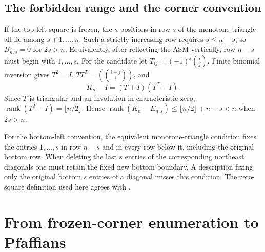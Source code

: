 \documentclass[11pt,a4paper]{amsart}
\theoremstyle{remark}\newtheorem{remark}[theorem]{Remark}
\numberwithin{equation}{section}
\DeclareMathOperator{\rank}{rank}
\begin{document}
\subsection{The forbidden range and the corner convention}
If the top-left square is frozen, the $s$ positions in row $s$ of the monotone triangle all lie among $s+1,\ldots,n$. Such a strictly increasing row requires $s\le n-s$, so $B_{n,s}=0$ for $2s>n$. Equivalently, after reflecting the ASM vertically, row $n-s$ must begin with $1,\ldots,s$.
For the candidate let $T_{ij}=(-1)^j\binom ij$. Finite binomial inversion gives $T^2=I$, $TT^T=(\binom{i+j}{i})$, and
\[
 K_n-I=(T+I)(T^T-I).
\]
Since $T$ is triangular and an involution in characteristic zero, $\rank(T^T-I)=\lfloor n/2\rfloor$. Hence
$\rank(K_n-E_{n,s})\le\lfloor n/2\rfloor+n-s<n$ when $2s>n$.

For the bottom-left convention, the equivalent monotone-triangle condition fixes the entries $1,\ldots,s$ in row $n-s$ and in every row below it, including the original bottom row. When deleting the last $s$ entries of the corresponding northeast diagonals one must retain the fixed new bottom boundary. A description fixing only the original bottom $s$ entries of a diagonal misses this condition. The zero-square definition used here agrees with \cite[Conjecture 6]{FR}.

\section{From frozen-corner enumeration to Pfaffians}\label{sec:integral}
\end{document}
